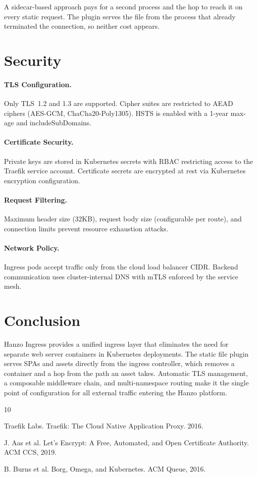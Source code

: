 \documentclass[11pt,twocolumn]{article}
\begin{document}
A sidecar-based approach pays for a second process and the hop to reach it on every static request. The plugin serves the file from the process that already terminated the connection, so neither cost appears.

\section{Security}

\paragraph{TLS Configuration.} Only TLS~1.2 and 1.3 are supported. Cipher suites are restricted to AEAD ciphers (AES-GCM, ChaCha20-Poly1305). HSTS is enabled with a 1-year max-age and includeSubDomains.

\paragraph{Certificate Security.} Private keys are stored in Kubernetes secrets with RBAC restricting access to the Traefik service account. Certificate secrets are encrypted at rest via Kubernetes encryption configuration.

\paragraph{Request Filtering.} Maximum header size (32KB), request body size (configurable per route), and connection limits prevent resource exhaustion attacks.

\paragraph{Network Policy.} Ingress pods accept traffic only from the cloud load balancer CIDR. Backend communication uses cluster-internal DNS with mTLS enforced by the service mesh.

\section{Conclusion}

Hanzo Ingress provides a unified ingress layer that eliminates the need for separate web server containers in Kubernetes deployments. The static file plugin serves SPAs and assets directly from the ingress controller, which removes a container and a hop from the path an asset takes. Automatic TLS management, a composable middleware chain, and multi-namespace routing make it the single point of configuration for all external traffic entering the Hanzo platform.


\begin{thebibliography}{10}

Traefik Labs. Traefik: The Cloud Native Application Proxy. 2016.

J. Aas et al. Let's Encrypt: A Free, Automated, and Open Certificate Authority. ACM CCS, 2019.

B. Burns et al. Borg, Omega, and Kubernetes. ACM Queue, 2016.

\end{thebibliography}
\end{document}
